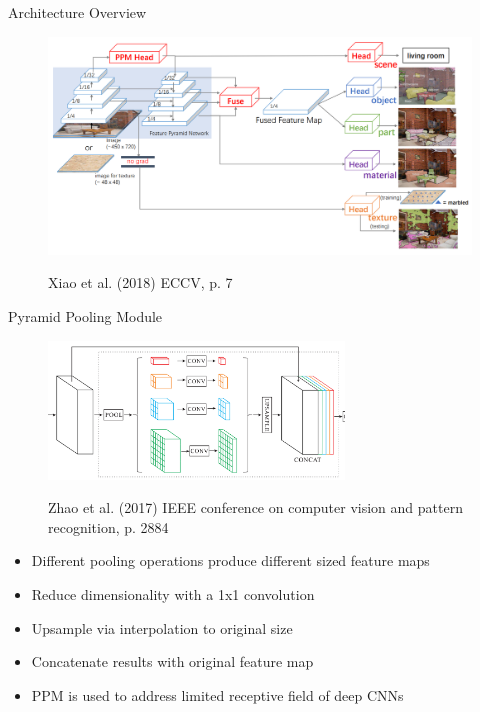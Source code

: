 \documentclass{beamer}
\begin{document}

\begin{frame}{Architecture Overview}
    \begin{figure}
        \centering
        \includegraphics[width=\textwidth]{Images/UPerNetArchitectureOverview_noHeads.png}

        \vspace{0.5em}
        {\tiny Xiao et al. (2018) ECCV, p. 7}
    \end{figure}
\end{frame}


\begin{frame}{Pyramid Pooling Module}
    \begin{figure}
        \centering
        \includegraphics[width=0.7\textwidth]{Images/PPMModuleOverview.png}

        {\tiny Zhao et al. (2017) IEEE conference on computer vision and pattern recognition, p. 2884}
    \end{figure}
    \begin{itemize}
        \item Different pooling operations produce different sized feature maps
        \item Reduce dimensionality with a 1x1 convolution
        \item Upsample via interpolation to original size
        \item Concatenate results with original feature map
        \item PPM is used to address limited receptive field of deep CNNs
    \end{itemize}
\end{frame}
\end{document}
